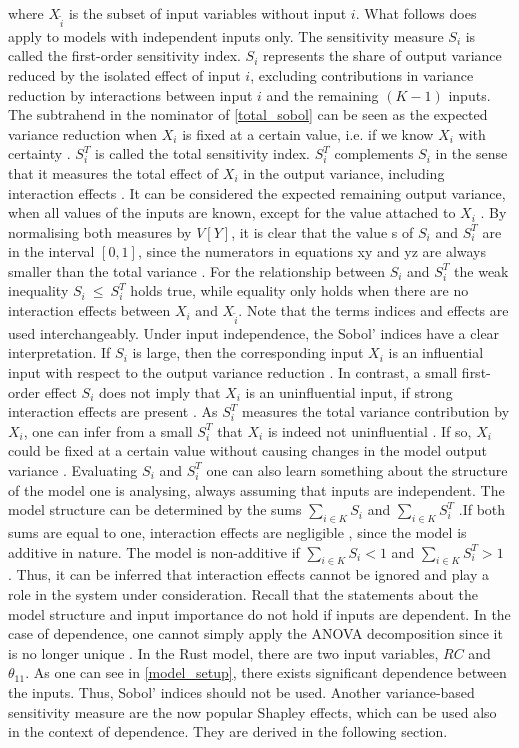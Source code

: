 where $X_{\tilde i}$ is the subset of input variables without input $i$. What follows does apply to models with independent inputs only. The sensitivity measure $S_i$ is called the first-order sensitivity index. $S_i$ represents the share of output variance reduced by the isolated effect of input $i$, excluding contributions in variance reduction by interactions between input $i$ and the remaining $(K-1)$ inputs. The subtrahend in the nominator of \cref{total_sobol} can be seen as the expected variance reduction when $X_i$ is fixed at a certain value, i.e. if we know $X_i$ with certainty \cite{SNS16}. $S_i^T$ is called the total sensitivity index. $S_i^T$ complements $S_i$ in the sense that it measures the total effect of $X_i$ in the output variance, including interaction effects \cite{SNS16}. It can be considered the expected remaining output variance, when all values of the inputs are known, except for the value attached to $X_i$ \cite{SNS16}. By normalising both measures by $V[Y]$, it is clear that the value s of $S_i$ and $S_i^T$ are in the interval $[0, 1]$, since the numerators in equations xy and yz are always smaller than the total variance \cite{GM17}. For the relationship between $S_i$ and $S_i^T$ the weak inequality $S_i\ \le\ S_i^T$ holds true, while equality only holds when there are no interaction effects between $X_i$ and $X_{\tilde i}$. Note that the terms indices and effects are used interchangeably.
Under input independence, the Sobol’ indices have a clear interpretation. If $S_i$ is large, then the corresponding input $X_i$ is an influential input with respect to the output variance reduction \cite{GM17}. In contrast, a small first-order effect $S_i$ does not imply that $X_i$ is an uninfluential input, if strong interaction effects are present \cite{GM17}. As $S_i^T$ measures the total variance contribution by $X_i$, one can infer from a small $S_i^T$ that $X_i$ is indeed not uninfluential \cite{GM17}. If so, $X_i$ could be fixed at a certain value without causing changes in the model output variance \cite{GM17}.
Evaluating $S_i$ and $S_i^T$ one can also learn something about the structure of the model one is analysing, always assuming that inputs are independent. The model structure can be determined by the sums $\sum_{i \in K} S_i$ and $\sum_{i \in K} S_i^T$ \cite{GM17}.If both sums are equal to one, interaction effects are negligible , since the model is additive in nature. The model is non-additive if $\sum_{i \in K} S_i < 1$ and $\sum_{i \in K} S_i^T > 1$ \cite{GM17}. Thus, it can be inferred that interaction effects cannot be ignored and play a role in the system under consideration.
Recall that the statements about the model structure and input importance do not hold if inputs are dependent. In the case of dependence, one cannot simply apply the ANOVA decomposition since it is no longer unique \cite{O14}. In the Rust model, there are two input variables, $RC$ and $\theta_{11}$. As one can see in \cref{model_setup}, there exists significant dependence between the inputs. Thus, Sobol’ indices should not be used. Another variance-based sensitivity measure are the now popular Shapley effects, which can be used also in the context of dependence. They are derived in the following section.

